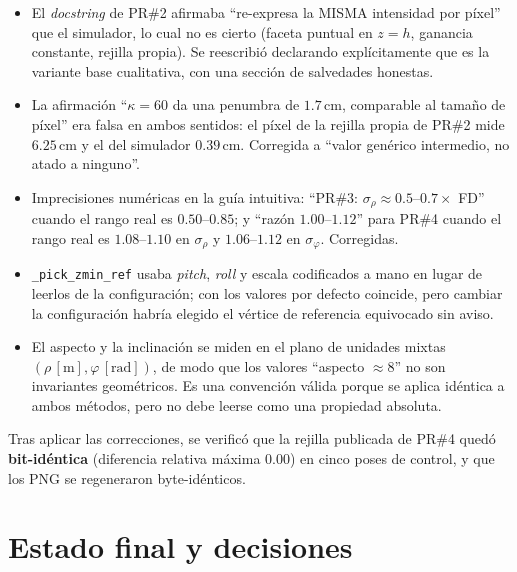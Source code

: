 \documentclass[11pt,a4paper]{article}
\newcommand{\code}[1]{\texttt{#1}}
\theoremstyle{definition}
\begin{document}
\begin{itemize}[leftmargin=*]
  \item El \emph{docstring} de PR\#2 afirmaba \enquote{re-expresa la MISMA intensidad
        por píxel} que el simulador, lo cual no es cierto (faceta puntual en
        $z=h$, ganancia constante, rejilla propia). Se reescribió declarando
        explícitamente que es la variante base cualitativa, con una sección de
        salvedades honestas.
  \item La afirmación \enquote{$\kappa=60$ da una penumbra de $1.7\,$cm, comparable al
        tamaño de píxel} era falsa en ambos sentidos: el píxel de la rejilla
        propia de PR\#2 mide $6.25\,$cm y el del simulador $0.39\,$cm.
        Corregida a \enquote{valor genérico intermedio, no atado a ninguno}.
  \item Imprecisiones numéricas en la guía intuitiva: \enquote{PR\#3: $\sigma_\rho
        \approx0.5$--$0.7\times$ FD} cuando el rango real es $0.50$--$0.85$; y
        \enquote{razón $1.00$--$1.12$} para PR\#4 cuando el rango real es
        $1.08$--$1.10$ en $\sigma_\rho$ y $1.06$--$1.12$ en $\sigma_\varphi$.
        Corregidas.
  \item \code{\_pick\_zmin\_ref} usaba \emph{pitch}, \emph{roll} y escala
        codificados a mano en lugar de leerlos de la configuración; con los
        valores por defecto coincide, pero cambiar la configuración habría
        elegido el vértice de referencia equivocado sin aviso.
  \item El aspecto y la inclinación se miden en el plano de unidades mixtas
        $(\rho\,[\text{m}], \varphi\,[\text{rad}])$, de modo que los valores
        \enquote{aspecto $\approx8$} no son invariantes geométricos. Es una convención
        válida porque se aplica idéntica a ambos métodos, pero no debe leerse
        como una propiedad absoluta.
\end{itemize}

Tras aplicar las correcciones, se verificó que la rejilla publicada de PR\#4
quedó \textbf{bit-idéntica} (diferencia relativa máxima $0.00$) en cinco poses
de control, y que los PNG se regeneraron byte-idénticos.

\section{Estado final y decisiones}
\label{sec:final}
\end{document}

